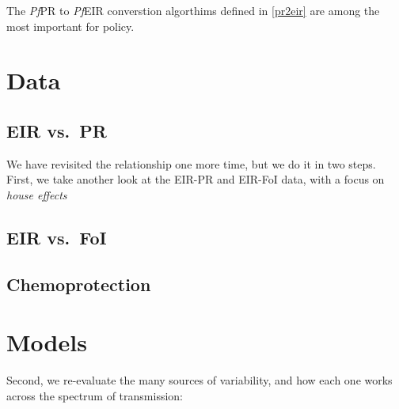 \documentclass[
]{book}
\begin{document}
The \emph{Pf}PR to \emph{Pf}EIR converstion algorthims defined in \ref{pr2eir} are among the most important for policy.

\hypertarget{data}{%
\section{Data}\label{data}}

\hypertarget{eir-vs.-pr}{%
\subsection{EIR vs.~PR}\label{eir-vs.-pr}}

We have revisited the relationship one more time, but we do it in two steps. First, we take another look at the EIR-PR and EIR-FoI data, with a focus on \emph{house effects}

\hypertarget{eir-vs.-foi}{%
\subsection{EIR vs.~FoI}\label{eir-vs.-foi}}

\hypertarget{chemoprotection-1}{%
\subsection{Chemoprotection}\label{chemoprotection-1}}

\hypertarget{models}{%
\section{Models}\label{models}}

Second, we re-evaluate the many sources of variability, and how each one works across the spectrum of transmission:
\end{document}
